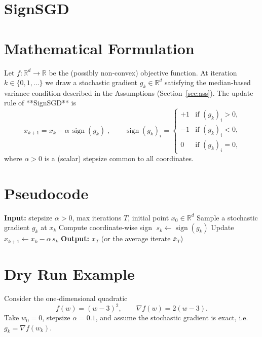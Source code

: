 \documentclass{article}
\newcommand{\sign}{\operatorname{sign}}
\newcommand{\R}{\mathbb{R}}
\begin{document}
\section*{SignSGD}

\section*{Mathematical Formulation}
Let $f:\R^{d}\rightarrow\R$ be the (possibly non‑convex) objective function.  
At iteration $k\in\{0,1,\dots\}$ we draw a stochastic gradient $g_k\in\R^{d}$ satisfying the
median‑based variance condition described in the Assumptions (Section~\ref{sec:ass}).  
The update rule of **SignSGD** is
\begin{equation}
\boxed{ \; x_{k+1}=x_{k}-\alpha\,\sign(g_k)\; }, \qquad
\sign(g_k)_i=
\begin{cases}
+1 & \text{if } (g_k)_i>0,\\[2mm]
-1 & \text{if } (g_k)_i<0,\\[2mm]
0  & \text{if } (g_k)_i=0,
\end{cases}
\label{eq:update}
\end{equation}
where $\alpha>0$ is a (scalar) stepsize common to all coordinates.

\section*{Pseudocode}
\begin{algorithm}[H]
\caption{SignSGD with median‑based variance bound}
\label{alg:signsgd}
\begin{algorithmic}[1]
\State \textbf{Input:} stepsize $\alpha>0$, max iterations $T$, initial point $x_0\in\R^{d}$
    \State Sample a stochastic gradient $g_k$ at $x_k$
    \State Compute coordinate‑wise sign $\; s_k \gets \sign(g_k)$
    \State Update \; $x_{k+1}\gets x_k-\alpha\,s_k$
\EndFor
\State \textbf{Output:} $x_T$ (or the average iterate $\bar x_T$)
\end{algorithmic}
\end{algorithm}

\section*{Dry Run Example}
Consider the one‑dimensional quadratic
\[
f(w)=(w-3)^2,\qquad \nabla f(w)=2(w-3).
\]
Take $w_0=0$, stepsize $\alpha=0.1$, and assume the stochastic gradient is exact,
i.e. $g_k=\nabla f(w_k)$.  
\end{document}

